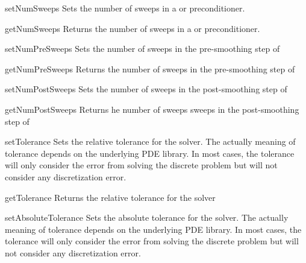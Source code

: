 \begin{methoddesc}[SolverOptions]{setNumSweeps}{}
Sets the number of sweeps in a \JACOBI or \GAUSSSEIDEL preconditioner.
\end{methoddesc}

\begin{methoddesc}[SolverOptions]{getNumSweeps}{}
Returns the number of sweeps in a \JACOBI or \GAUSSSEIDEL preconditioner.
\end{methoddesc}

\begin{methoddesc}[SolverOptions]{setNumPreSweeps}{}
Sets the number of sweeps in the pre-smoothing step of \AMG
\end{methoddesc}

\begin{methoddesc}[SolverOptions]{getNumPreSweeps}{}
Returns the number of sweeps in the pre-smoothing step of \AMG
\end{methoddesc}

\begin{methoddesc}[SolverOptions]{setNumPostSweeps}{}
Sets the number of sweeps in the post-smoothing step of \AMG
\end{methoddesc}

\begin{methoddesc}[SolverOptions]{getNumPostSweeps}{}
Returns he number of sweeps sweeps in the post-smoothing step of \AMG
\end{methoddesc}

\begin{methoddesc}[SolverOptions]{setTolerance}{}
Sets the relative tolerance for the solver. The actually meaning of tolerance depends 
on the underlying PDE library. In most cases, the tolerance
will only consider the error from solving the discrete problem but will
not consider any discretization error.
\end{methoddesc}

\begin{methoddesc}[SolverOptions]{getTolerance}{}
Returns the relative tolerance for the solver
\end{methoddesc}

\begin{methoddesc}[SolverOptions]{setAbsoluteTolerance}{}
Sets the absolute tolerance for the solver. The actually meaning of tolerance depends 
on the underlying PDE library. In most cases, the tolerance
will only consider the error from solving the discrete problem but will
not consider any discretization error.
\end{methoddesc}

